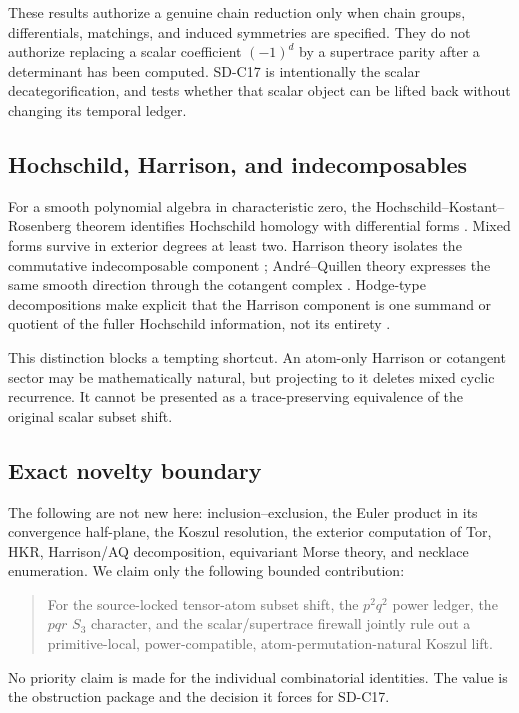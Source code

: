 These results authorize a genuine chain reduction only when chain groups,
differentials, matchings, and induced symmetries are specified.  They do not
authorize replacing a scalar coefficient $(-1)^d$ by a supertrace parity
after a determinant has been computed.  SD-C17 is intentionally the scalar
decategorification, and  tests whether that scalar object
can be lifted back without changing its temporal ledger.

\subsection{Hochschild, Harrison, and indecomposables}

For a smooth polynomial algebra in characteristic zero, the
Hochschild--Kostant--Rosenberg theorem identifies Hochschild homology with
differential forms \citep{hkr1962}.  Mixed forms survive in exterior degrees
at least two.  Harrison theory isolates the commutative indecomposable
component \citep{barr1968}; André--Quillen theory expresses the same smooth
direction through the cotangent complex \citep{quillen1970}.  Hodge-type
decompositions make explicit that the Harrison component is one summand or
quotient of the fuller Hochschild information, not its entirety
\citep{gerstenhaberschack1987,loday1998}.

This distinction blocks a tempting shortcut.  An atom-only Harrison or
cotangent sector may be mathematically natural, but projecting to it deletes
mixed cyclic recurrence.  It cannot be presented as a trace-preserving
equivalence of the original scalar subset shift.

\subsection{Exact novelty boundary}

The following are not new here: inclusion--exclusion, the Euler product in
its convergence half-plane, the Koszul resolution, the exterior computation
of Tor, HKR, Harrison/AQ decomposition, equivariant Morse theory, and
necklace enumeration.  We claim only the following bounded contribution:

\begin{quote}
For the source-locked tensor-atom subset shift, the $p^2q^2$ power ledger,
the $pqr$ $S_3$ character, and the scalar/supertrace firewall jointly rule
out a primitive-local, power-compatible, atom-permutation-natural Koszul lift.
\end{quote}

No priority claim is made for the individual combinatorial identities.  The
value is the obstruction package and the decision it forces for SD-C17.
